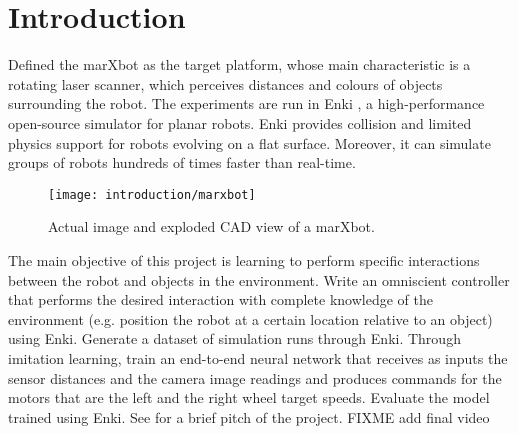 \section{Introduction}
Defined the marXbot \cite{bonani2010marxbot} as the target platform, whose main 
characteristic is a rotating laser scanner, which perceives distances and 
colours of objects surrounding the robot. The experiments are run in Enki  
\cite{enki}, a high-performance open-source simulator for planar robots. Enki 
provides collision and limited physics support for robots evolving on a flat 
surface. 
Moreover, it can simulate groups of robots hundreds of times faster than real-time.

\begin{figure}[htbp]
	\centerline{\texttt{[image: introduction/marxbot]}}
	\caption{Actual image and exploded CAD view of a marXbot.}
	\label{fig:marxbot}
\end{figure}

The main objective of this project is learning to perform specific interactions between the robot and objects in the 
environment.
Write an omniscient controller that performs the desired interaction with complete knowledge of the environment (e.g. 
position the robot at a certain location relative to an object) using Enki.
Generate a dataset of simulation runs through Enki. 
Through imitation learning, train an end-to-end neural network that receives as inputs the sensor distances and the 
camera image readings and produces commands for the motors that are the left and the right wheel target speeds.
Evaluate the model trained using Enki.
See \cite{pitch} for a brief pitch of the project. FIXME add final video
